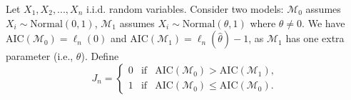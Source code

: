 Let $X_1, X_2, ..., X_n$ i.i.d. random variables.
Consider two models: $\mathcal{M}_0$ assumes $X_i \sim \mathrm{Normal}(0, 1)$, $\mathcal{M}_1$ assumes $X_i \sim \mathrm{Normal}(\theta, 1)$ where $\theta \neq 0$.
We have $\mathrm{AIC}(\mathcal{M}_0) = \ell_n(0)$ and $\mathrm{AIC}(\mathcal{M}_1) = \ell_n(\hat{\theta}) - 1$, as $\mathcal{M}_1$ has one extra parameter (i.e., $\theta$).
Define
\begin{equation*}
    J_n = \left\{\begin{matrix}
        0 & \text{if} & \mathrm{AIC}(\mathcal{M}_0) > \mathrm{AIC}(\mathcal{M}_1), \\
        1 & \text{if} & \mathrm{AIC}(\mathcal{M}_0) \leq \mathrm{AIC}(\mathcal{M}_0).
    \end{matrix}\right.
\end{equation*}

